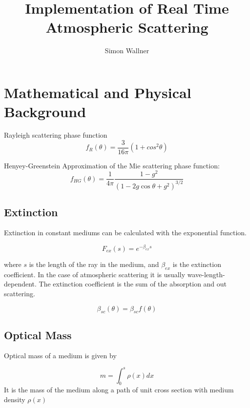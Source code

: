 \documentclass[12pt,a4paper]{scrartcl}
\author{Simon Wallner}
\title{Implementation of Real Time Atmospheric Scattering}
\begin{document}
\maketitle


\section{Mathematical and Physical Background}
Rayleigh scattering phase function \cite{Preetham03Modeling-skylight}
\begin{equation}
f_R(\theta) = \frac{3}{16\pi} (1 + cos^2\theta)
\end{equation}

Henyey-Greenstein Approximation of the Mie scattering phase function: \cite{HenyeyGreenstein41Diffuse-radiation, Preetham03Modeling-skylight}
\begin{equation}
f_{HG}(\theta) = \frac{1}{4\pi} \frac{1 - g^2}{(1 - 2g\cos \theta + g^2) ^{3/2}}
\end{equation}


\subsection{Extinction}
Extinction in constant mediums can be calculated with the exponential function. 

\begin{equation}
F_{ex}(s) = e^{-\beta_{ex}s}
\end{equation}

where $s$ is the length of the ray in the medium, and $\beta_{ex}$ is the extinction coefficient. In the case of atmospheric scattering it is usually wave-length-dependent. The extinction coefficient is the sum of the absorption and out scattering.

\begin{equation}
\beta_{sc}(\theta) = \beta_{sc} f(\theta)
\end{equation}


\subsection{Optical Mass}
Optical mass of a medium is given by \cite{Preetham03Modeling-skylight}

\begin{equation}
m = \int^s_0 \rho(x)dx
\end{equation}
It is the mass of the medium along a path of unit cross section with medium density $\rho(x)$
\end{document}
